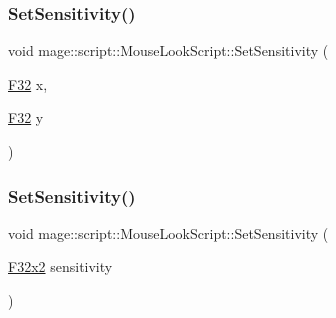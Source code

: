 \hypertarget{classmage_1_1script_1_1_mouse_look_script_a6116637b42e58b8f40de86ed47b54fe3}{}\label{classmage_1_1script_1_1_mouse_look_script_a6116637b42e58b8f40de86ed47b54fe3} 
\subsubsection{\texorpdfstring{Set\+Sensitivity()}{SetSensitivity()}\hspace{0.1cm}{\footnotesize\ttfamily [1/3]}}
{\footnotesize\ttfamily void mage\+::script\+::\+Mouse\+Look\+Script\+::\+Set\+Sensitivity (\begin{DoxyParamCaption}\item[{\hyperlink{namespacemage_aa97e833b45f06d60a0a9c4fc22ae02c0}{F32}}]{x,  }\item[{\hyperlink{namespacemage_aa97e833b45f06d60a0a9c4fc22ae02c0}{F32}}]{y }\end{DoxyParamCaption})}

\hypertarget{classmage_1_1script_1_1_mouse_look_script_adf611a4d9240e6cf338b665a2713cd9f}{}\label{classmage_1_1script_1_1_mouse_look_script_adf611a4d9240e6cf338b665a2713cd9f} 
\subsubsection{\texorpdfstring{Set\+Sensitivity()}{SetSensitivity()}\hspace{0.1cm}{\footnotesize\ttfamily [2/3]}}
{\footnotesize\ttfamily void mage\+::script\+::\+Mouse\+Look\+Script\+::\+Set\+Sensitivity (\begin{DoxyParamCaption}\item[{\hyperlink{namespacemage_aa87237ad091f5cd7da612b8523fc108f}{F32x2}}]{sensitivity }\end{DoxyParamCaption})\hspace{0.3cm}{\ttfamily [noexcept]}}

\hypertarget{classmage_1_1script_1_1_mouse_look_script_a784937d1254fe26ee28864d11956cd80}{}\label{classmage_1_1script_1_1_mouse_look_script_a784937d1254fe26ee28864d11956cd80} 
